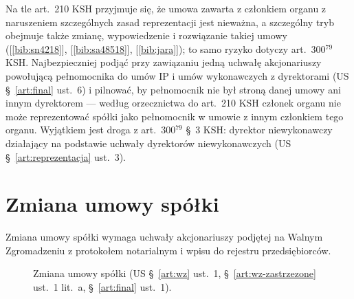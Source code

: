 \documentclass[11pt,a4paper]{report}
\newcommand{\Zr}[1]{[\ref{bib:#1}]}
\begin{document}
\begin{Komentarz}
Na tle art.~210 KSH przyjmuje się, że umowa zawarta z członkiem organu z naruszeniem szczególnych zasad reprezentacji jest nieważna, a szczególny tryb obejmuje także zmianę, wypowiedzenie i rozwiązanie takiej umowy (\Zr{sn4218}, \Zr{sa48518}, \Zr{jara}); to samo ryzyko dotyczy art.~300$^{79}$ KSH. Najbezpieczniej podjąć przy zawiązaniu jedną uchwałę akcjonariuszy powołującą pełnomocnika do umów IP i umów wykonawczych z dyrektorami (US §~\ref{art:final} ust.~6) i pilnować, by pełnomocnik nie był stroną danej umowy ani innym dyrektorem --- według orzecznictwa do art.~210 KSH członek organu nie może reprezentować spółki jako pełnomocnik w umowie z innym członkiem tego organu. Wyjątkiem jest droga z art.~300$^{79}$ §~3 KSH: dyrektor niewykonawczy działający na podstawie uchwały dyrektorów niewykonawczych (US §~\ref{art:reprezentacja} ust.~3).
\end{Komentarz}

\section{Zmiana umowy spółki}

Zmiana umowy spółki wymaga uchwały akcjonariuszy podjętej na Walnym Zgromadzeniu z protokołem notarialnym i wpisu do rejestru przedsiębiorców.

\begin{figure}[H]
\centering
{}
\caption{Zmiana umowy spółki (US §~\ref{art:wz} ust.~1, §~\ref{art:wz-zastrzezone} ust.~1 lit.~a, §~\ref{art:final} ust.~1).}
\end{figure}
\end{document}
